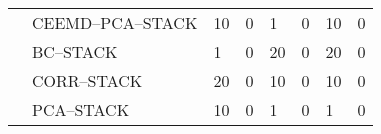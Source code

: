 \begin{tiny}
\begin{center}
\begin{longtable}[htb!]{llll|ll|ll}
            & CEEMD--PCA--STACK      & 10                & 0                & 1                 & 0                & 10                & 0                \\
            & BC--STACK              & 1                 & 0                & 20                & 0                & 20                & 0                \\
            & CORR--STACK            & 20                & 0                & 10                & 0                & 10                & 0                \\
            & PCA--STACK             & 10                & 0                & 1                 & 0                & 1                 & 0                \\ \hline
\end{longtable}
\end{center}
\end{tiny}